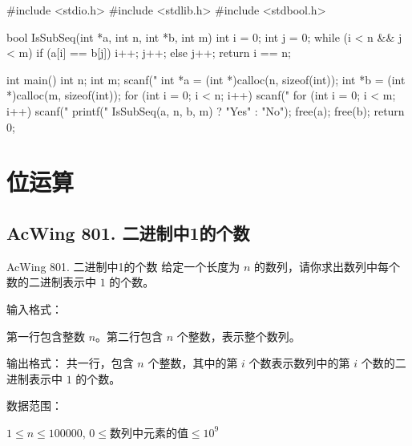 \begin{mycpptwocol}[判断子序列]
    #include <stdio.h>
    #include <stdlib.h>
    #include <stdbool.h>

    bool IsSubSeq(int *a, int n, int *b, int m) {
        int i = 0;
        int j = 0;
        while (i < n && j < m) {
            if (a[i] == b[j]) {
                i++;
                j++;
            } else {
                j++;
            }
        }
        return i == n;
    }

    int main() {
        int n;
        int m;
        scanf("%
        int *a = (int *)calloc(n, sizeof(int));
        int *b = (int *)calloc(m, sizeof(int));
        for (int i = 0; i < n; i++) {
            scanf("%
        }
        for (int i = 0; i < m; i++) {
            scanf("%
        }
        printf("%
        IsSubSeq(a, n, b, m) ? "Yes" : "No");
        free(a);
        free(b);
        return 0;
    }
\end{mycpptwocol}


\section{位运算}

\subsection{AcWing 801. 二进制中1的个数}
\begin{titledbox}{AcWing 801. 二进制中1的个数}
    给定一个长度为 $n$ 的数列，请你求出数列中每个数的二进制表示中 $1$ 的个数。

    输入格式：

    第一行包含整数 $n$。第二行包含 $n$ 个整数，表示整个数列。

    输出格式：
    共一行，包含 $n$ 个整数，其中的第 $i$ 个数表示数列中的第 $i$ 个数的二进制表示中 $1$ 的个数。

    数据范围：

    $1 \le n \le 100000$, $0 \le \text{数列中元素的值} \le 10^9$

    \begin{inputblock}
         \\
    \end{inputblock}
    \begin{outputblock}
    \end{outputblock}
\end{titledbox}

